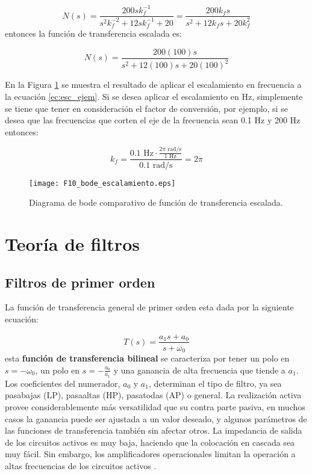 	\begin{equation}
	N(s) = \frac{200sk_{f}^{-1}}{s^{2}k^{-2}_{f} + 12sk^{-1}_{f} + 20} = \frac{200k_{f}s}{s^{2} + 12 k_{f} s + 20 k^{2}_{f}}
	\end{equation}
	entonces la función de transferencia escalada es:

	\begin{equation}
		N(s)  = \frac{200(100)s}{s^{2} + 12(100)s + 20(100)^{2}}
	\end{equation}
	
	En la Figura \ref{fig:F10_bode_escalamiento} se muestra el resultado de aplicar el escalamiento en frecuencia a la ecuación \ref{ec:esc_ejem}. Si se desea aplicar el escalamiento en Hz, simplemente se tiene que tener en consideración el factor de conversión, por ejemplo, si se desea que las frecuencias que corten el eje de la frecuencia sean 0.1 Hz y 200 Hz entonces:
	
	\begin{equation}
	k_{f} = \frac{0.1 \,\,\mathrm{Hz} \cdot \frac{2 \pi \,\,\mathrm{rad/s}}{1 \,\,\mathrm{Hz}}}{0.1 \,\,\mathrm{rad/s}} = 2 \pi
	\end{equation}
	
	\begin{figure}[hbtp]
	\caption{Diagrama de bode comparativo de función de transferencia escalada.} 
	\label{fig:F10_bode_escalamiento}
	\centering
	\texttt{[image: F10\_bode\_escalamiento.eps]}
	\end{figure}
	
	\section{Teoría de filtros}
	
	\subsection{Filtros de primer orden}
	
	La función de transferencia general de primer orden esta dada por la siguiente ecuación:
	
	\begin{equation}
	T(s) = \frac{a_{1} s + a_{0} }{s + \omega_{0}}
	\end{equation}
	esta \textbf{función de transferencia bilineal} se caracteriza por tener un polo en $s = - \omega_{0}$, un polo en $s = -\frac{a_{0}}{a_{1}}$ y una ganancia de alta frecuencia que tiende a $a_{1}$. Los coeficientes del numerador, $a_{0}$ y $a_{1}$, determinan el tipo de filtro, ya sea pasabajas (LP), pasaaltas (HP), pasatodas (AP) o general. La realización activa provee considerablemente más versatilidad que su contra parte pasiva, en muchos casos la ganancia puede ser ajustada a un valor deseado, y algunos parámetros de las funciones de transferencia también sin afectar otros. La impedancia de salida de los circuitos activos es muy baja, haciendo que la colocación en cascada sea muy fácil. Sin embargo, los amplificadores operacionales limitan la operación a altas frecuencias de los circuitos activos \cite{Sedra2015}.
	
